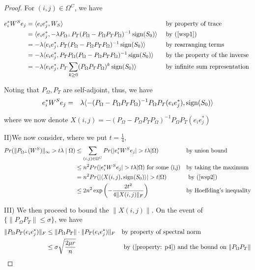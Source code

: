 \begin{proof}
For $(i,j)\in\Omega^{C}$, we have

\[
\begin{aligned}
e_{i}^{*}W^{S}e_{j}
& = \langle e_{i}e_{j}^{*},W_{S} \rangle
&&\text{ by property of trace}\\
& = \langle e_{i}e_{j}^{*},-\lambda P_{\Omega^{\bot}}P_{T}(P_{\Omega}-P_{\Omega}P_{T}P_{\Omega})^{-1} \operatorname{sign}(S_{0}) \rangle
&&\text{ by (\ref{wsp1})}\\
& = -\lambda \langle e_{i}e_{j}^{*},P_{T}(P_{\Omega}-P_{\Omega}P_{T}P_{\Omega})^{-1} \operatorname{sign}(S_{0}) \rangle
&&\text{ by rearranging terms}\\
& = -\lambda \langle e_{i}e_{j}^{*},P_{T}P_{\Omega}(P_{\Omega}-P_{\Omega}P_{T}P_{\Omega})^{-1} \operatorname{sign}(S_{0}) \rangle
&&\text{ by the property of the inverse }\\
& = -\lambda \langle e_{i}e_{j}^{*},P_{T}\sum_{k\ge0}(P_{\Omega}P_{T}P_{\Omega})^{k} \operatorname{sign}(S_{0}) \rangle
&&\text{ by infinite sum representation}
\end{aligned}
\]

Noting that $P_{\Omega},P_{T}$ are self-adjoint, thus, we have
\begin{eqnarray}
e_{i}^{*}W^{S}e_{j} & = & \lambda \langle-(P_{\Omega}-P_{\Omega}P_{T}P_{\Omega})^{-1}P_{\Omega}P_{T}(e_{i}e_{j}^{*}), \operatorname{sign}(S_{0}) \rangle
\label{wsp2}
\end{eqnarray}


where we now denote $X(i,j)=-(P_{\Omega}-P_{\Omega}P_{T}P_{\Omega})^{-1}P_{\Omega}P_{T}(e_{i}e_{j}^{*})$

II)We now consider, where we put $t=\frac{1}{4}$,
\[
\begin{aligned}
Pr(\|P_{\Omega^{\bot}}(W^{S})\|_{\infty}>t\lambda\mid\Omega)
& \le \sum_{(i,j)\in\Omega^{C}}Pr(|e_{i}^{*}W^{S}e_{j}|>t\lambda|\Omega)
&&\text{by union bound}\\
& \le n^{2}Pr(|e_{i}^{*}W^{S}e_{j}|>t\lambda|\Omega)\text{ for some (i,j)}
&&\text{by taking the maximum}\\
& = n^{2}Pr(| \langle X(i,j), \sign(S_{0}) \rangle|>t|\Omega)
&&\text{ by (\ref{wsp2})}\\
& \le 2n^{2}\exp \left( -\frac{2t^{2}}{4\|X(i,j)\|_{F}} \right)
&&\text{by Hoeffding's inequality}
\end{aligned}
\]

III) We then proceed to bound the $\|X(i,j)\|$. On the event of $\{\|P_{\Omega}P_{T}\|\le\sigma\}$,
we have
\[
\begin{aligned}
\|P_{\Omega}P_{T}(e_{i}e_{j}^{*})\|_{F}
& \le \|P_{\Omega}P_{T}\|\cdot\|P_{T}(e_{i}e_{j}^{*})\|_{F}
&&\text{by property of spectral norm}\\
& \le \sigma\sqrt{\frac{2\mu r}{n}}
&&\text{ by (\ref{property: p4}) and the bound on } \|P_{\Omega}P_{T}\|
\end{aligned}
\]



\end{proof}
